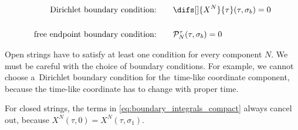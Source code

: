 \begin{align}
\label{eq:dirichlet_boundary}
    \text{Dirichlet boundary condition:} & \qquad \difs[] {X^{N}} {\tau} (\tau, \sigma_b) = 0\\[15pt]
    \text{free endpoint boundary condition:} & \qquad \mathcal{P}^{\tau}_{N} (\tau, \sigma_b) = 0
\end{align}
\vspace{0mm}

\noindent

\noindent
Open strings have to satisfy at least one condition for every component $N$. We must be careful with the choice of boundary conditions. For example, we cannot choose a~Dirichlet boundary condition for the~time-like coordinate component, because the time-like coordinate has to change with proper time. 

For closed strings, the terms in \cref{eq:boundary_integrals_compact} always cancel out, because $X^N(\tau, 0) = X^N (\tau, \sigma_1)$.